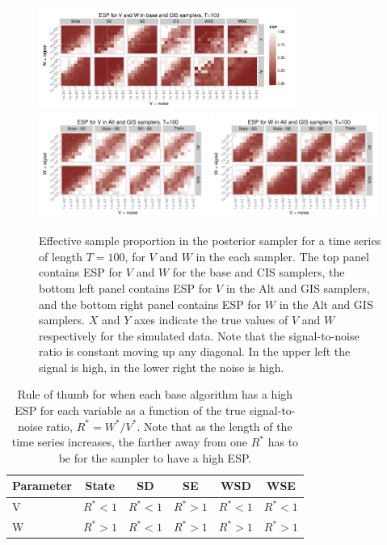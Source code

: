 \documentclass[12pt]{article}
\begin{document}
\begin{figure}[!h]
\centering
\includegraphics[width=0.75\textwidth]{basecisESplot100}
\includegraphics[width=0.49\textwidth]{altintESplotV100}
\includegraphics[width=0.49\textwidth]{altintESplotW100}
\caption{Effective sample proportion in the posterior sampler for a time series of length $T=100$, for $V$ and $W$ in the each sampler. The top panel contains ESP for $V$ and $W$ for the base and CIS samplers, the bottom left panel contains ESP for $V$ in the Alt and GIS samplers, and the bottom right panel contains ESP for $W$ in the Alt and GIS samplers. $X$ and $Y$ axes indicate the true values of $V$ and $W$ respectively for the simulated data. Note that the signal-to-noise ratio is constant moving up any diagonal. In the upper left the signal is high, in the lower right the noise is high.}
\label{ESplot}
\end{figure}

\begin{table}
  \centering
  \begin{tabular}{|l|ccccc|}\hline
    Parameter & State & SD & SE & WSD & WSE \\\hline
    V & $R^* < 1$ & $R^* < 1$ & $R^* > 1$ & $R^* < 1$ & $R^* < 1$\\
    W & $R^* > 1$ & $R^* < 1$ & $R^* > 1$ & $R^* > 1$ & $R^* > 1$ \\\hline
  \end{tabular}
  \caption{Rule of thumb for when each base algorithm has a high ESP for each variable as a function of the true signal-to-noise ratio, $R^*=W^*/V^*$. Note that as the length of the time series increases, the farther away from one $R^*$ has to be for the sampler to have a high ESP.}
  \label{tab:stnmix}
\end{table}
\end{document}
